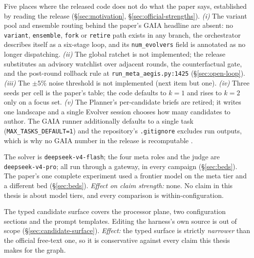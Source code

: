 \begin{description}[leftmargin=1.4em,style=nextline,itemsep=5pt]

  \item[\textnormal{\textbf{Paper-versus-release divergences.}}] Five
        places where the released code does not do what the paper says,
        established by reading the release (\S\ref{sec:motivation},
        \S\ref{sec:official-strengths}). \emph{(i)} The variant pool and
        ensemble routing behind the paper's GAIA headline are absent: no
        \texttt{variant}, \texttt{ensemble}, \texttt{fork} or
        \texttt{retire} path exists in any branch, the orchestrator
        describes itself as a six-stage loop, and its \texttt{num\_evolvers}
        field is annotated as no longer dispatching. \emph{(ii)} The global
        ratchet is not implemented; the release substitutes an advisory
        watchlist over adjacent rounds, the counterfactual gate, and the
        post-round rollback rule at \texttt{run\_meta\_aegis.py:1425}
        (\S\ref{sec:open-loop}). \emph{(iii)} The $\pm 5\%$ noise threshold
        is not implemented (next item but one). \emph{(iv)} Three seeds per
        cell is the paper's table; the code defaults to $k{=}1$ and rises
        to $k{=}2$ only on a focus set. \emph{(v)} The Planner's
        per-candidate briefs are retired; it writes one landscape and a
        single Evolver session chooses how many candidates to author. The
        GAIA runner additionally defaults to a single task
        (\texttt{MAX\_TASKS\_DEFAULT=1}) and the repository's
        \texttt{.gitignore} excludes run outputs, which is why no GAIA
        number in the release is recomputable .

  \item[\textnormal{\textbf{Model tier.}}] \begingroup\sloppy The solver is
        \texttt{deepseek-\allowbreak v4-\allowbreak flash}; the four meta roles and the judge are
        \texttt{deepseek-\allowbreak v4-\allowbreak pro}; all run through a gateway, in every
        campaign (\S\ref{sec:beds}). The paper's one
        complete experiment used a frontier model on the meta tier and a
        different bed (\S\ref{sec:beds}). \emph{Effect on claim strength:}
        none. No claim in this thesis is about model tiers, and every
        comparison is within-configuration.\par\endgroup

  \item[\textnormal{\textbf{Edit-surface coverage.}}] The typed candidate
        surface covers the processor plane, two configuration sections and
        the prompt templates. Editing the harness's own source is out of
        scope (\S\ref{sec:candidate-surface}). \emph{Effect:} the typed
        surface is strictly \emph{narrower} than the official free-text
        one, so it is conservative against every claim this thesis makes
        for the graph.


\end{description}
